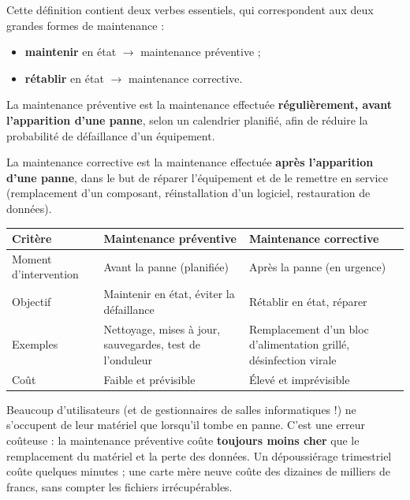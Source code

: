 \documentclass[11pt]{article}
\newcommand{\cle}[1]{{\popxbold\color{popdark}#1}}
\begin{document}
Cette définition contient deux verbes essentiels, qui correspondent aux deux grandes formes de maintenance :

\begin{itemize}
  \item \textbf{maintenir} en état $\rightarrow$ \cle{maintenance préventive} ;
  \item \textbf{rétablir} en état $\rightarrow$ \cle{maintenance corrective}.
\end{itemize}

\begin{definition}
La \cle{maintenance préventive} est la maintenance effectuée \textbf{régulièrement, avant l'apparition d'une panne}, selon un calendrier planifié, afin de réduire la probabilité de défaillance d'un équipement.
\end{definition}

\begin{definition}
La \cle{maintenance corrective} est la maintenance effectuée \textbf{après l'apparition d'une panne}, dans le but de réparer l'équipement et de le remettre en service (remplacement d'un composant, réinstallation d'un logiciel, restauration de données).
\end{definition}

\begin{center}
\begin{tabularx}{\linewidth}{|l|X|X|}
\hline
\rowcolor{popblueL} \textbf{Critère} & \textbf{Maintenance préventive} & \textbf{Maintenance corrective} \\
\hline
Moment d'intervention & Avant la panne (planifiée) & Après la panne (en urgence) \\
\hline
Objectif & Maintenir en état, éviter la défaillance & Rétablir en état, réparer \\
\hline
Exemples & Nettoyage, mises à jour, sauvegardes, test de l'onduleur & Remplacement d'un bloc d'alimentation grillé, désinfection virale \\
\hline
Coût & Faible et prévisible & Élevé et imprévisible \\
\hline
\end{tabularx}
\end{center}

\begin{attention}
Beaucoup d'utilisateurs (et de gestionnaires de salles informatiques !) ne s'occupent de leur matériel que lorsqu'il tombe en panne. C'est une erreur coûteuse : la \cle{maintenance préventive} coûte \textbf{toujours moins cher} que le remplacement du matériel et la perte des données. Un dépoussiérage trimestriel coûte quelques minutes ; une carte mère neuve coûte des dizaines de milliers de francs, sans compter les fichiers irrécupérables.
\end{attention}
\end{document}
